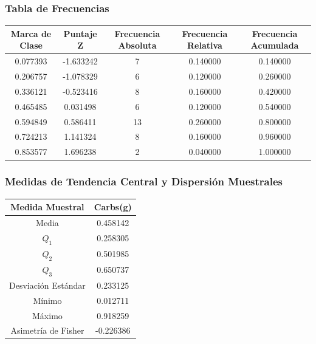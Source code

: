 \documentclass[12pt,a4paper]{article}
\begin{document}
    \subsubsection{Tabla de Frecuencias}
        \begin{center}
            \begin{tabular}{|c|c|c|c|c|}
                \hline
                Marca de Clase & Puntaje Z & Frecuencia Absoluta & Frecuencia Relativa & Frecuencia Acumulada \\
                \hline
                0.077393 & -1.633242 & 7  & 0.140000 & 0.140000 \\
                0.206757 & -1.078329 & 6  & 0.120000 & 0.260000 \\
                0.336121 & -0.523416 & 8  & 0.160000 & 0.420000 \\
                0.465485 & 0.031498  & 6  & 0.120000 & 0.540000 \\
                0.594849 & 0.586411  & 13 & 0.260000 & 0.800000 \\
                0.724213 & 1.141324  & 8  & 0.160000 & 0.960000 \\
                0.853577 & 1.696238  & 2  & 0.040000 & 1.000000 \\
                \hline
            \end{tabular}
        \end{center}

    \subsubsection{Medidas de Tendencia Central y Dispersión Muestrales}
        \begin{center}
            \begin{tabular}{|c|c|}
                \hline
                Medida Muestral & Carbs(g) \\
                \hline
                Media & 0.458142  \\
                $Q_1$ & 0.258305 \\
                $Q_2$ & 0.501985 \\
                $Q_3$ & 0.650737 \\
                Desviación Estándar & 0.233125 \\
                Mínimo & 0.012711 \\
                Máximo & 0.918259 \\
                Asimetría de Fisher & -0.226386 \\
                \hline
            \end{tabular}
        \end{center}
\end{document}
